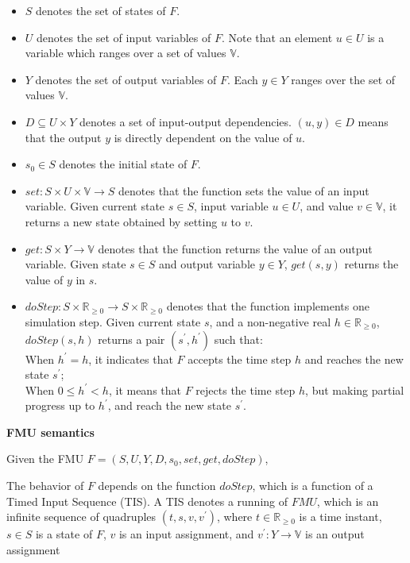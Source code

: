 \begin{itemize}
\item
$S$ denotes the set of states of $F$. 
\item
$U$ denotes the set of input variables of $F$. Note that an element $u \in U$ is a variable which ranges over a set of values $\mathbb{V}$. 
\item
$Y$ denotes the set of output variables of $F$. Each $y \in Y$ ranges over the set of values $\mathbb{V}$.
\item
$D \subseteq U \times Y$ denotes a set of input-output dependencies. $(u,y) \in D $ means that the output $y$ is directly dependent on the value of $u$. 
\item
$s_{0} \in S$ denotes the initial state of $F$.
\item
$set : S \times U \times \mathbb{V} \rightarrow S$ denotes that the function sets the value of an input variable. Given current state $s \in S$, input variable $u \in U$, and value $v \in \mathbb{V}$, it returns a new state obtained by setting $u$ to $v$.
\item
$get : S \times Y \rightarrow \mathbb{V}$ denotes that the  function returns the value of an output variable. Given state $s \in S$ and output variable $y \in Y$, $get(s,y)$ returns the value of $y$ in $s$.
\item
$doStep : S \times \mathbb{R}_{\geqslant{0}} \rightarrow S \times \mathbb{R}_{\geqslant{0}}$ denotes that the function implements one simulation step. Given current state $s$, and a non-negative real $h \in \mathbb{R}_{\geqslant{0}}$, $doStep(s,h)$ returns a pair $(s^{\prime},h^{\prime})$ such that:
\\
    When $h^{\prime} = h$, it indicates that $F$ accepts the time step $h$ and reaches the new state $s^{\prime}$;
\\
    When $0 \leqslant h^{\prime} < h$, it means that $F$ rejects the time step $h$, but making partial progress up to $h^{\prime}$, and reach the new state $s^{\prime}$.
\end{itemize}
\begin{definition}
\textbf{FMU semantics}

Given the FMU $F=(S,U,Y,D,s_{0},set,get,doStep)$,
\end{definition} 
The behavior of $F$ depends on the function $doStep$, which is a function of a Timed Input Sequence (TIS).
A TIS denotes a running of $FMU$, which is an infinite sequence of quadruples $(t,s,v,v^{\prime})$, where $t \in \mathbb{R}_{\geqslant{0}}$ is a time instant, $s \in S$ is a state of $F$, $v$ is an input assignment, and $v^{\prime} : Y \rightarrow \mathbb{V}$ is an output assignment
 
